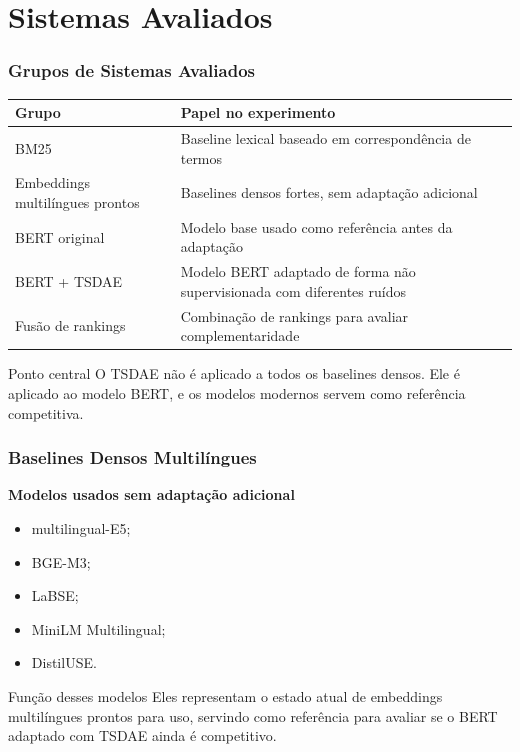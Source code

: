 \documentclass[aspectratio=169]{beamer}
\begin{document}
\section{Sistemas Avaliados}

\begin{frame}
\frametitle{Grupos de Sistemas Avaliados}

\begin{table}
\centering
\small
\begin{tabular}{@{}p{}p{}@{}}
\toprule
\textbf{Grupo} & \textbf{Papel no experimento} \\
\midrule
BM25 & Baseline lexical baseado em correspondência de termos \\
Embeddings multilíngues prontos & Baselines densos fortes, sem adaptação adicional \\
BERT original & Modelo base usado como referência antes da adaptação \\
BERT + TSDAE & Modelo BERT adaptado de forma não supervisionada com diferentes ruídos \\
Fusão de rankings & Combinação de rankings para avaliar complementaridade \\
\bottomrule
\end{tabular}
\end{table}

\vspace{0.25cm}

\begin{alertblock}{Ponto central}
O TSDAE não é aplicado a todos os baselines densos. Ele é aplicado ao modelo BERT, e os modelos modernos servem como referência competitiva.
\end{alertblock}

\end{frame}

\begin{frame}
\frametitle{Baselines Densos Multilíngues}

\textbf{Modelos usados sem adaptação adicional}

\vspace{0.2cm}

\begin{itemize}
  \item multilingual-E5;
  \item BGE-M3;
  \item LaBSE;
  \item MiniLM Multilingual;
  \item DistilUSE.
\end{itemize}

\vspace{0.35cm}

\begin{block}{Função desses modelos}
Eles representam o estado atual de embeddings multilíngues prontos para uso, servindo como referência para avaliar se o BERT adaptado com TSDAE ainda é competitivo.
\end{block}

\vspace{0.15cm}



\end{frame}
\end{document}
